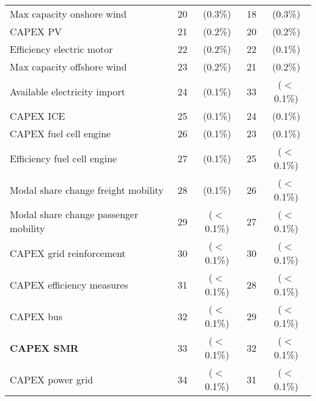 \begin{table}[htbp!]
\begin{minipage}{\textwidth}
{\begin{tabular}{l c c|c c}
Max capacity onshore wind & 20 & (0.3\%) & 18 & (0.3\%) \\
CAPEX PV & 21 & (0.2\%) & 20 & (0.2\%) \\
Efficiency electric motor & 22 & (0.2\%) & 22 & (0.1\%)\\
Max capacity offshore wind & 23 & (0.2\%) & 21 & (0.2\%) \\
Available electricity import & 24 & (0.1\%) & 33 & ($<$0.1\%) \\
CAPEX ICE & 25 & (0.1\%) & 24 & (0.1\%)\\
CAPEX fuel cell engine & 26 & (0.1\%) & 23 & (0.1\%) \\
Efficiency fuel cell engine & 27 & (0.1\%) & 25 & ($<$0.1\%) \\
Modal share change freight mobility & 28 & (0.1\%) & 26 & ($<$0.1\%) \\
Modal share change passenger mobility & 29 & ($<$0.1\%) & 27 & ($<$0.1\%) \\
CAPEX grid reinforcement & 30 & ($<$0.1\%) & 30 & ($<$0.1\%) \\
CAPEX efficiency measures & 31 & ($<$0.1\%) & 28 & ($<$0.1\%) \\
CAPEX bus & 32 &($<$0.1\%)  & 29 & ($<$0.1\%) \\
\textbf{CAPEX \gls{SMR}} & 33 & ($<$0.1\%)  & 32 & ($<$0.1\%) \\
CAPEX power grid & 34 & ($<$0.1\%) & 31 & ($<$0.1\%) \\
\bottomrule							

\end{tabular}}
\end{minipage}
\end{table}





